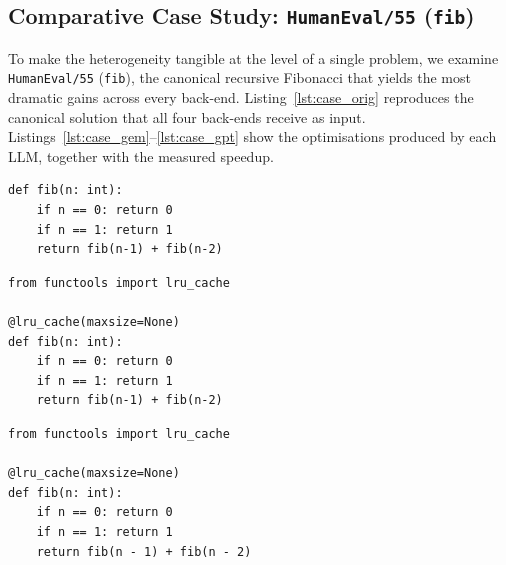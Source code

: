 \documentclass[conference]{IEEEtran}
\begin{document}
\subsection{Comparative Case Study: \texttt{HumanEval/55} (\texttt{fib})}
\label{sec:case_study}

To make the heterogeneity tangible at the level of a single problem, we examine \texttt{HumanEval/55} (\texttt{fib}), the canonical recursive Fibonacci that yields the most dramatic gains across every back-end. Listing~\ref{lst:case_orig} reproduces the canonical solution that all four back-ends receive as input. Listings~\ref{lst:case_gem}--\ref{lst:case_gpt} show the optimisations produced by each LLM, together with the measured speedup.

\par\medskip\noindent
\begin{minipage}{\columnwidth}
\begin{lstlisting}[caption={Original \texttt{fib} (HumanEval/55), fed to all back-ends.}, label={lst:case_orig}]
def fib(n: int):
    if n == 0: return 0
    if n == 1: return 1
    return fib(n-1) + fib(n-2)
\end{lstlisting}
\end{minipage}\par\medskip

\par\medskip\noindent
\begin{minipage}{\columnwidth}
\begin{lstlisting}[caption={Gemini 2.5 Flash Lite on \texttt{fib} (speedup $\mathbf{157.22\times}$).}, label={lst:case_gem}]
from functools import lru_cache

@lru_cache(maxsize=None)
def fib(n: int):
    if n == 0: return 0
    if n == 1: return 1
    return fib(n-1) + fib(n-2)
\end{lstlisting}
\end{minipage}\par\medskip

\par\medskip\noindent
\begin{minipage}{\columnwidth}
\begin{lstlisting}[caption={Llama 3.3 70B on \texttt{fib} (speedup $\mathbf{122.72\times}$).}, label={lst:case_lla}]
from functools import lru_cache

@lru_cache(maxsize=None)
def fib(n: int):
    if n == 0: return 0
    if n == 1: return 1
    return fib(n - 1) + fib(n - 2)
\end{lstlisting}
\end{minipage}\par\medskip
\end{document}
